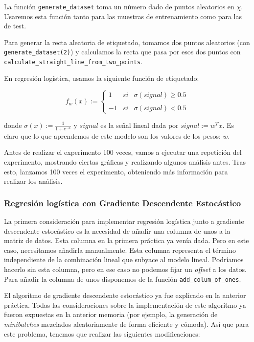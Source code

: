\documentclass[11pt]{article}
\begin{document}
La función \lstinline{generate_dataset} toma un número dado de puntos aleatorios en $\chi$. Usaremos esta función tanto para las muestras de entrenamiento como para las de test.

Para generar la recta aleatoria de etiquetado, tomamos dos puntos aleatorios (con \lstinline{generate_dataset(2)}) y calculamos la recta que pasa por esos dos puntos con \lstinline{calculate_straight_line_from_two_points}.

En regresión logística, usamos la siguiente función de etiquetado:

$$
f_w(x):= \left\{ \begin{array}{lcc}
        1 &  si & \sigma(signal) \geq 0.5 \\
    \\ -1 &  si & \sigma(signal) < 0.5
    \end{array}
\right.
$$

donde $\sigma(x) := \frac{1}{1 + e^{-x}}$ y $signal$ es la señal lineal dada por $signal := w^T x$. Es claro que lo que aprendemos de este modelo son los valores de los pesos: $w$.

Antes de realizar el experimento 100 veces, vamos a ejecutar una repetición del experimento, mostrando ciertas gráficas y realizando algunos análisis antes. Tras esto, lanzamos 100 veces el experimento, obteniendo más información para realizar los análisis.

\subsubsection{Regresión logística con Gradiente Descendente Estocástico}

La primera consideración para implementar regresión logística junto a gradiente descendente estocástico es la necesidad de añadir una columna de unos a la matriz de datos. Esta columna en la primera práctica ya venía dada. Pero en este caso, necesitamos añadirla manualmente. Esta columna representa el término independiente de la combinación lineal que subyace al modelo lineal. Podríamos hacerlo sin esta columna, pero en ese caso no podemos fijar un \emph{offset} a los datos. Para añadir la columna de unos disponemos de la función \lstinline{add_colum_of_ones}.

El algoritmo de gradiente descendente estocástico ya fue explicado en la anterior práctica. Todas las consideraciones sobre la implementación de este algoritmo ya fueron expuestas en la anterior memoria (por ejemplo, la generación de \emph{minibatches} mezclados aleatoriamente de forma eficiente y cómoda). Así que para este problema, tenemos que realizar las siguientes modificaciones:
\end{document}
